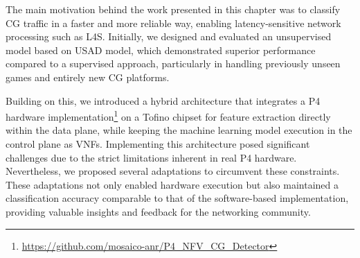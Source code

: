The main motivation behind the work presented in this chapter was to classify CG traffic in a faster and more reliable way, enabling latency-sensitive network processing such as L4S. Initially, we designed and evaluated an unsupervised model based on USAD model,  which demonstrated superior performance compared to a supervised approach, particularly in handling previously unseen games and entirely new CG platforms.

Building on this, we introduced a hybrid architecture that integrates a P4 hardware implementation\footnote{\url{https://github.com/mosaico-anr/P4_NFV_CG_Detector}} on a Tofino chipset for feature extraction directly within the data plane, while keeping the machine learning model execution in the control plane as VNFs. Implementing this architecture posed significant challenges due to the strict limitations inherent in real P4 hardware. Nevertheless, we proposed several adaptations to circumvent these constraints. These adaptations not only enabled hardware execution but also maintained a classification accuracy comparable to that of the software-based implementation, providing valuable insights and feedback for the networking community. %

